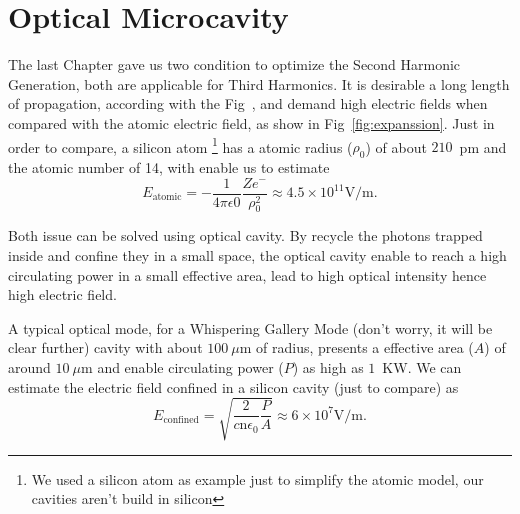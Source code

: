\chapter{Optical Microcavity}
\label{chap:optical_cavity}
%
%

The last Chapter gave us two condition to optimize the Second Harmonic Generation, both are applicable for Third Harmonics\needcit. It is desirable a long length of propagation, according with the Fig~, and demand high electric fields when compared with the atomic electric field, as show in Fig~\ref{fig:expanssion}. Just in order to compare, a silicon atom \footnote{We used a silicon atom as example just to simplify the atomic model, our cavities aren't build in silicon} has a atomic radius ($\rho_0$) of about $210$~pm and the atomic number of 14, with enable us to estimate   
\begin{equation}
   E_\text{atomic} = -\frac{1}{4 \pi \epsilon0}\frac{Z e^-}{\rho_0^2} %
    \approx 4.5\times10^{11}\text{V/m}.
\end{equation}

Both issue can be solved using optical cavity. By recycle the photons trapped inside and confine they in a small space, the optical cavity enable to reach a high circulating power in a small effective area, lead to high optical intensity hence high electric field. 

A typical optical mode, for a Whispering Gallery Mode (don't worry, it will be clear further) cavity with about $100~\mu$m of radius, presents a effective area ($A$) of around $10~\mu$m and enable circulating power ($P$) as high as $1$~KW. We can estimate the electric field confined in a silicon cavity (just to compare) as 
\begin{equation}
    E_\text{confined} = \sqrt{\frac{2}{c\text{n}\epsilon_0}\frac{P}{A}} \approx 6 \times 10^7\text{V/m}.
\end{equation}

